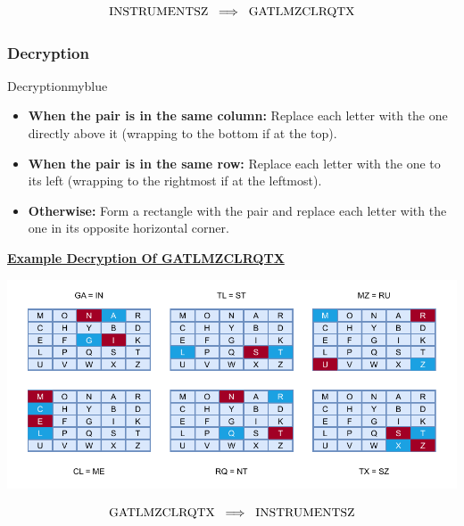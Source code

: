 \[\text{INSTRUMENTSZ} \hspace{0.2cm} \Longrightarrow \hspace{0.2cm} \text{GATLMZCLRQTX}\]

\vspace{1cm}

\subsubsection{Decryption}
\begin{prettyBox}{Decryption}{myblue}
\begin{itemize}
    \item \textbf{When the pair is in the same column:} Replace each letter
with the one directly above it (wrapping to the bottom if at the top).
    \item \textbf{When the pair is in the same row:} Replace each letter with
the one to its left (wrapping to the rightmost if at the leftmost).
    \item \textbf{Otherwise:} Form a rectangle with the pair and replace each
letter with the one in its opposite horizontal corner.
\end{itemize}
\end{prettyBox}

\vspace{0.85cm}


\textbf{\underline{Example Decryption Of GATLMZCLRQTX}}

\vspace{0.5cm}


\begin{center}
    \includegraphics{Chapters/Diagram/Crypto/pf2.drawio.pdf}
\end{center}


\[\text{GATLMZCLRQTX} \hspace{0.2cm} \Longrightarrow \hspace{0.2cm} \text{INSTRUMENTSZ}\]

